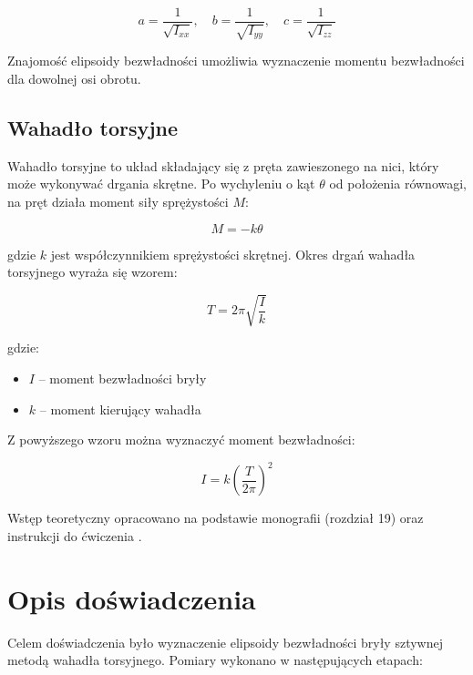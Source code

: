 \documentclass[a4paper,12pt]{article}
\begin{document}
\begin{equation*}
    a = \frac{1}{\sqrt{I_{xx}}}, \quad
    b = \frac{1}{\sqrt{I_{yy}}}, \quad
    c = \frac{1}{\sqrt{I_{zz}}}
\end{equation*}

Znajomość elipsoidy bezwładności umożliwia wyznaczenie momentu bezwładności dla dowolnej osi obrotu.

\subsection*{Wahadło torsyjne}

Wahadło torsyjne to układ składający się z pręta zawieszonego na nici, który może wykonywać drgania skrętne. Po wychyleniu o kąt $\theta$ od położenia równowagi, na pręt działa moment siły sprężystości $M$:

\begin{equation}
    M = -k\theta
\end{equation}

gdzie $k$ jest współczynnikiem sprężystości skrętnej. Okres drgań wahadła torsyjnego wyraża się wzorem:

\begin{equation} \label{eq:okres_drgan_w_zaleznosci_od_momentu_bezwladnosci}
    T = 2\pi \sqrt{\frac{I}{k}}
\end{equation}

gdzie:
\begin{itemize}
    \item $I$ -- moment bezwładności bryły
    \item $k$ -- moment kierujący wahadła
\end{itemize}

Z powyższego wzoru można wyznaczyć moment bezwładności:

\begin{equation} \label{eq:moment_bezwladnosci_w_zaleznosci_od_okresu}
    I = k \left(\frac{T}{2\pi}\right)^2
\end{equation}

Wstęp teoretyczny opracowano na podstawie monografii \cite{Drynski1976} (rozdział 19) oraz instrukcji do ćwiczenia \cite{lab11manual}.
\section{Opis doświadczenia}

Celem doświadczenia było wyznaczenie elipsoidy bezwładności bryły sztywnej metodą wahadła torsyjnego. Pomiary wykonano w następujących etapach:
\end{document}
